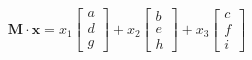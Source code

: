 \documentclass[preview]{standalone}
\begin{document}
\begin{align*}
\mathbf{M} \cdot \mathbf{x} = x_1 \begin{bmatrix} a \\ d \\ g \end{bmatrix} +x_2 \begin{bmatrix} b \\ e \\ h \end{bmatrix} +x_3 \begin{bmatrix} c \\ f \\ i \end{bmatrix}
\end{align*}
\end{document}
